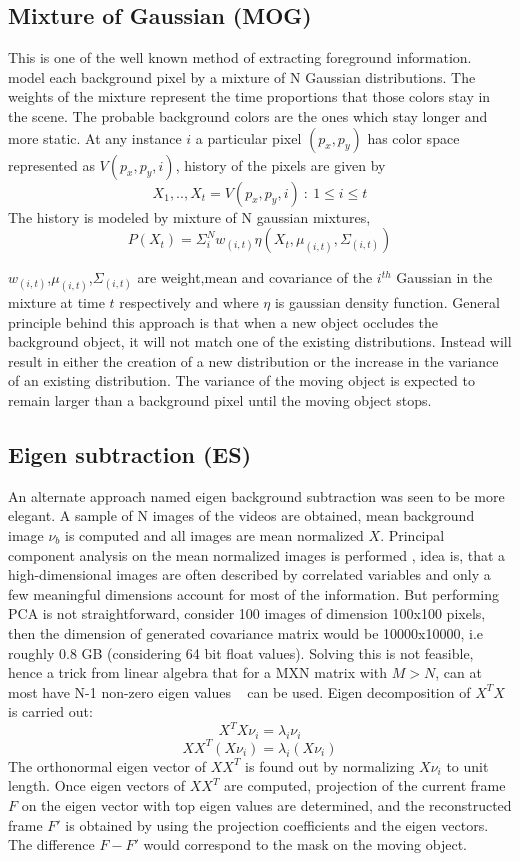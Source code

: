 \subsection{Mixture of Gaussian (MOG)}
This is one of the well known method of extracting foreground information. \cite{kaew} model each background pixel by a mixture of N Gaussian distributions. The weights of the mixture represent the time proportions that those colors stay in the scene. The probable background colors are the ones which stay longer and more static. At any instance $i$ a particular pixel $(p_x,p_y)$ has color space represented as $V(p_{x},p_{y},i)$, history of the pixels are given by 
$$X_{1},..,X_{t} = {V(p_{x},p_{y},i)~:~1\le i \le t }$$
The history is modeled by mixture of N gaussian mixtures,
$$P(X_{t})=\Sigma_{i}^{N}w_{(i,t)}\eta(X_{t},\mu_{(i,t)},\Sigma_{(i,t)})$$
\par $w_{(i,t)}$,$\mu_{(i,t)}$,$\Sigma_{(i,t)}$ are weight,mean and covariance of the $i^{th}$ Gaussian in the mixture at time $t$ respectively and where $\eta$ is gaussian density function. General principle behind this approach is that when a new object occludes the background object, it will not match one of the existing distributions. Instead will result in either the creation of a new distribution or the increase in the variance of an existing distribution. The variance of the moving object is expected to remain larger than a background pixel until the moving object stops.


\subsection{Eigen subtraction (ES)}
An alternate approach named eigen background subtraction was seen to be more elegant. A sample of N images of the videos are obtained, mean background image $\nu_b$ is computed and all images are mean normalized  $X$. Principal component analysis on the mean normalized images is performed , idea is, that a high-dimensional images are often described by correlated variables and only a few meaningful dimensions account for most of the information. But performing PCA is not straightforward, consider 100 images of dimension 100x100 pixels, then the dimension of generated covariance matrix would be 10000x10000, i.e roughly 0.8 GB (considering 64 bit float values). Solving this is not feasible, hence a trick from linear algebra that for a MXN matrix with $M>N$, can at most have N-1 non-zero eigen values ~\cite{Duda01} can be used. Eigen decomposition of $X^TX$ is carried out:
$$X^TX\nu_i=\lambda_i\nu_i$$
$$XX^T(X\nu_i)=\lambda_i(X\nu_i)$$
The orthonormal eigen vector of $XX^T$ is found out by normalizing $X\nu_i$ to unit length. Once eigen vectors of $XX^T$  are computed, projection of the current frame $F$ on the eigen vector with top eigen values are determined, and the reconstructed frame $F'$ is obtained by using the projection coefficients and the eigen vectors. The difference $F-F'$ would correspond to the mask on the moving object. 

